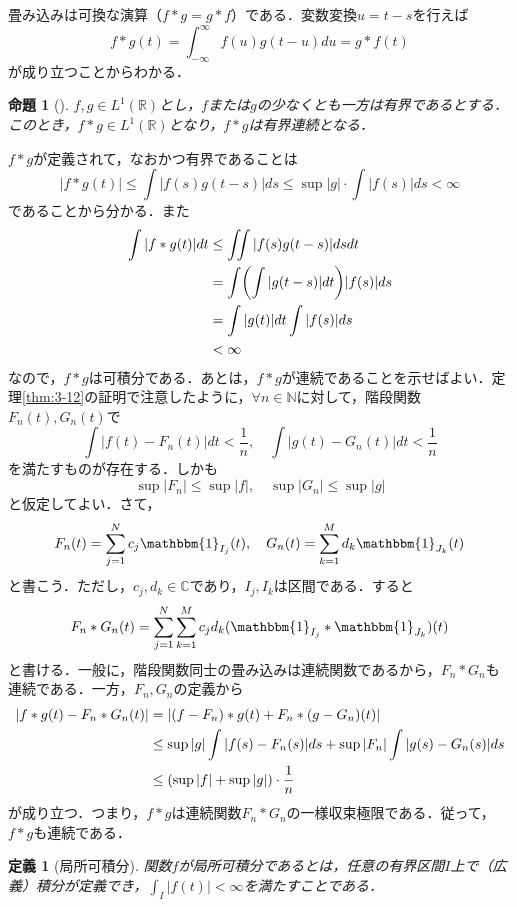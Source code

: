 \documentclass[dvipdfmx,a4j,10pt]{jsarticle}
\makeatletter
\theoremstyle{mystyle1}
\newtheorem{proposition}[theorem]{命題}
\theoremstyle{mystyle3}
\theoremstyle{mystyle4}
\theoremstyle{mystyle6}
\theoremstyle{mystyle2}
\newtheorem{dfn*}{定義}
\theoremstyle{mystyle5}
\renewenvironment{proof}[1][\proofname]{\par
  \pushQED{\qed}%
  \normalfont
  \topsep6\p@\@plus6\p@ \trivlist
  \item[\hskip\labelsep{\bfseries\sffamily #1}]\ignorespaces
}{%
  \popQED\endtrivlist\@endpefalse
}
\renewcommand\proofname{証明}
\newenvironment{prop}[1][]
{\begin{tcolorbox}[
    enhanced,
    boxrule=0pt,
    arc=0mm,
    frame hidden,
    borderline west={2pt}{-4pt}{blue!50!black},
    breakable = true
    ]
    \begin{proposition}[#1]
}
{\end{proposition}\end{tcolorbox}}
\makeatother
\begin{document}
畳み込みは可換な演算（$f*g=g*f$）である．変数変換$u=t-s$を行えば
\[
	f*g(t)=\int_{-\infty}^\infty f(u)g(t-u)du=g*f(t)
\]
が成り立つことからわかる．

\begin{prop}\label{prop:3-13}
	$f, g\in L^1(\mathbb{R})$とし，$f$または$g$の少なくとも一方は有界であるとする．このとき，$f*g\in L^1(\mathbb{R})$となり，$f*g$は有界連続となる．
\end{prop}

\begin{proof}
	$f*g$が定義されて，なおかつ有界であることは
	\[
		|f*g(t)|\leq\int|f(s)g(t-s)|ds\leq\sup|g|\cdot\int|f(s)|ds<\infty
	\]
	であることから分かる．また
	\[
		\begin{split}
			\int|f*g(t)|dt&\leq\iint|f(s)g(t-s)|dsdt \\
			&=\int\mleft(\int|g(t-s)|dt\mright)|f(s)|ds \\
			&=\int|g(t)|dt\int|f(s)|ds \\
			&<\infty
		\end{split}
	\]
	なので，$f*g$は可積分である．あとは，$f*g$が連続であることを示せばよい．定理\ref{thm:3-12}の証明で注意したように，$\forall n\in\mathbb{N}$に対して，階段関数$F_n(t), G_n(t)$で
	\[
		\int|f(t)-F_n(t)|dt<\frac{1}{n},\quad\int|g(t)-G_n(t)|dt<\frac{1}{n}
	\]
	を満たすものが存在する．しかも
	\[
		\sup|F_n|\leq\sup|f|,\quad\sup|G_n|\leq\sup|g|
	\]
	と仮定してよい．さて，
	\[
		F_n(t)=\sum_{j=1}^N c_j\mathbbm{1}_{I_j}(t),\quad G_n(t)=\sum_{k=1}^M d_k\mathbbm{1}_{J_k}(t)
	\]
	と書こう．ただし，$c_j, d_k\in\mathbb{C}$であり，$I_j, I_k$は区間である．すると
	\[
		F_n*G_n(t)=\sum_{j=1}^N\sum_{k=1}^M c_jd_k(\mathbbm{1}_{I_j}*\mathbbm{1}_{J_k})(t)
	\]
	と書ける．一般に，階段関数同士の畳み込みは連続関数であるから，$F_n*G_n$も連続である．一方，$F_n, G_n$の定義から
	\[
		\begin{split}
			|f*g(t)-F_n*G_n(t)|&=|(f-F_n)*g(t)+F_n*(g-G_n)(t)| \\
			&\leq\sup|g|\int|f(s)-F_n(s)|ds+\sup|F_n|\int|g(s)-G_n(s)|ds \\
			&\leq\mleft(\sup|f|+\sup|g|\mright)\cdot\frac{1}{n}
		\end{split}
	\]
	が成り立つ．つまり，$f*g$は連続関数$F_n*G_n$の一様収束極限である．従って，$f*g$も連続である．
\end{proof}

\begin{dfn*}[局所可積分]
	関数$f$が局所可積分であるとは，任意の有界区間$I$上で（広義）積分が定義でき，$\int_I |f(t)|<\infty$を満たすことである．
\end{dfn*}
\end{document}
